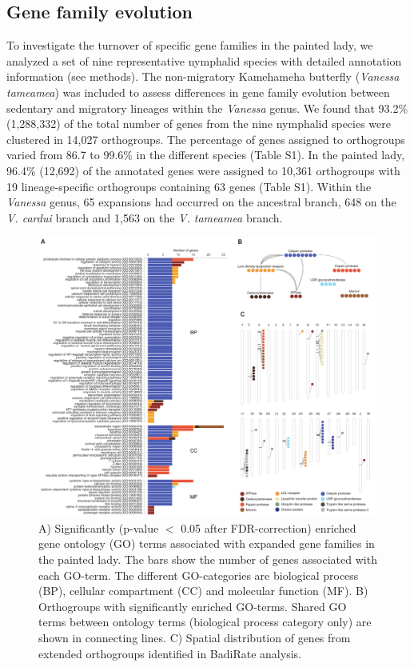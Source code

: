 \documentclass[twocolumn]{bmcart}%
\begin{document}
\subsection*{Gene family evolution}
To investigate the turnover of specific gene families in the painted lady, we analyzed a set of nine representative nymphalid species with detailed annotation information (see methods). The non-migratory Kamehameha butterfly (\textit{Vanessa tameamea}) was included to assess differences in gene family evolution between sedentary and migratory lineages within the \textit{Vanessa} genus. We found that 93.2\% (1,288,332) of the total number of genes from the nine nymphalid species were clustered in 14,027 orthogroups. The percentage of genes assigned to orthogroups varied from 86.7 to 99.6\% in the different species (Table S1). In the painted lady, 96.4\% (12,692) of the annotated genes were assigned to 10,361 orthogroups with 19 lineage-specific orthogroups containing 63 genes (Table S1). Within the \textit{Vanessa} genus, 65 expansions had occurred on the ancestral branch, 648 on the \textit{V. cardui} branch and 1,563 on the \textit{V. tameamea} branch.

\begin{figure}[tb]
    \centering
    \includegraphics[width=1.99\linewidth]{ShipilinaNasvallFig3opt.pdf}
    \caption{A) Significantly (p-value $<$ 0.05 after FDR-correction) enriched gene ontology (GO) terms associated with expanded gene families in the painted lady. The bars show the number of genes associated with each GO-term. The different GO-categories are biological process (BP), cellular compartment (CC) and molecular function (MF). B) Orthogroups with significantly enriched GO-terms. Shared GO terms between ontology terms (biological process category only) are shown in connecting lines. C) Spatial distribution of genes from extended orthogroups identified in BadiRate analysis.}
    \label{fig:3}
\end{figure}
\end{document}
